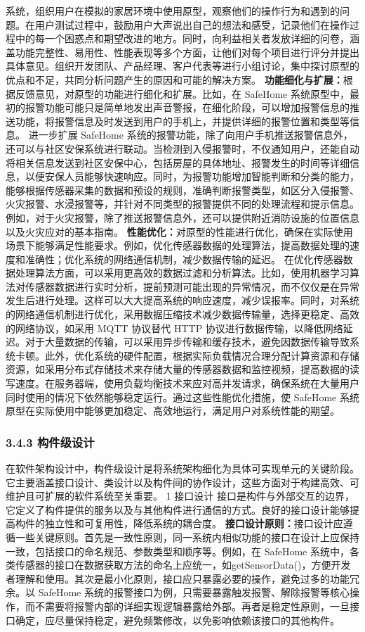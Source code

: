 系统，组织用户在模拟的家居环境中使用原型，观察他们的操作行为和遇到的问题。在用户测试过程中，鼓励用户大声说出自己的想法和感受，记录他们在操作过程中的每一个困惑点和期望改进的地方。同时，向利益相关者发放详细的问卷，涵盖功能完整性、易用性、性能表现等多个方面，让他们对每个项目进行评分并提出具体意见。组织开发团队、产品经理、客户代表等进行小组讨论，集中探讨原型的优点和不足，共同分析问题产生的原因和可能的解决方案。 \textbf{功能细化与扩展：}根据反馈意见，对原型的功能进行细化和扩展。比如，在 SafeHome 系统原型中，最初的报警功能可能只是简单地发出声音警报，在细化阶段，可以增加报警信息的推送功能，将报警信息及时发送到用户的手机上，并提供详细的报警位置和类型等信息。 进一步扩展 SafeHome 系统的报警功能，除了向用户手机推送报警信息外，还可以与社区安保系统进行联动。当检测到入侵报警时，不仅通知用户，还能自动将相关信息发送到社区安保中心，包括房屋的具体地址、报警发生的时间等详细信息，以便安保人员能够快速响应。同时，为报警功能增加智能判断和分类的能力，能够根据传感器采集的数据和预设的规则，准确判断报警类型，如区分入侵报警、火灾报警、水浸报警等，并针对不同类型的报警提供不同的处理流程和提示信息。例如，对于火灾报警，除了推送报警信息外，还可以提供附近消防设施的位置信息以及火灾应对的基本指南。 \textbf{性能优化：}对原型的性能进行优化，确保在实际使用场景下能够满足性能要求。例如，优化传感器数据的处理算法，提高数据处理的速度和准确性；优化系统的网络通信机制，减少数据传输的延迟。 在优化传感器数据处理算法方面，可以采用更高效的数据过滤和分析算法。比如，使用机器学习算法对传感器数据进行实时分析，提前预测可能出现的异常情况，而不仅仅是在异常发生后进行处理。这样可以大大提高系统的响应速度，减少误报率。同时，对系统的网络通信机制进行优化，采用数据压缩技术减少数据传输量，选择更稳定、高效的网络协议，如采用 MQTT 协议替代 HTTP 协议进行数据传输，以降低网络延迟。对于大量数据的传输，可以采用异步传输和缓存技术，避免因数据传输导致系统卡顿。此外，优化系统的硬件配置，根据实际负载情况合理分配计算资源和存储资源，如采用分布式存储技术来存储大量的传感器数据和监控视频，提高数据的读写速度。在服务器端，使用负载均衡技术来应对高并发请求，确保系统在大量用户同时使用的情况下依然能够稳定运行。通过这些性能优化措施，使 SafeHome 系统原型在实际使用中能够更加稳定、高效地运行，满足用户对系统性能的期望。 \subsubsection{3.4.3 构件级设计}\label{ux6784ux4ef6ux7ea7ux8bbeux8ba1} 在软件架构设计中，构件级设计是将系统架构细化为具体可实现单元的关键阶段。它主要涵盖接口设计、类设计以及构件间的协作设计，这些方面对于构建高效、可维护且可扩展的软件系统至关重要。 1 接口设计 接口是构件与外部交互的边界，它定义了构件提供的服务以及与其他构件进行通信的方式。良好的接口设计能够提高构件的独立性和可复用性，降低系统的耦合度。 \textbf{接口设计原则：}接口设计应遵循一些关键原则。首先是一致性原则，同一系统内相似功能的接口在设计上应保持一致，包括接口的命名规范、参数类型和顺序等。例如，在 SafeHome 系统中，各类传感器的接口在数据获取方法的命名上应统一，如getSensorData()，方便开发者理解和使用。其次是最小化原则，接口应只暴露必要的操作，避免过多的功能冗余。以 SafeHome 系统的报警接口为例，只需要暴露触发报警、解除报警等核心操作，而不需要将报警内部的详细实现逻辑暴露给外部。再者是稳定性原则，一旦接口确定，应尽量保持稳定，避免频繁修改，以免影响依赖该接口的其他构件。 